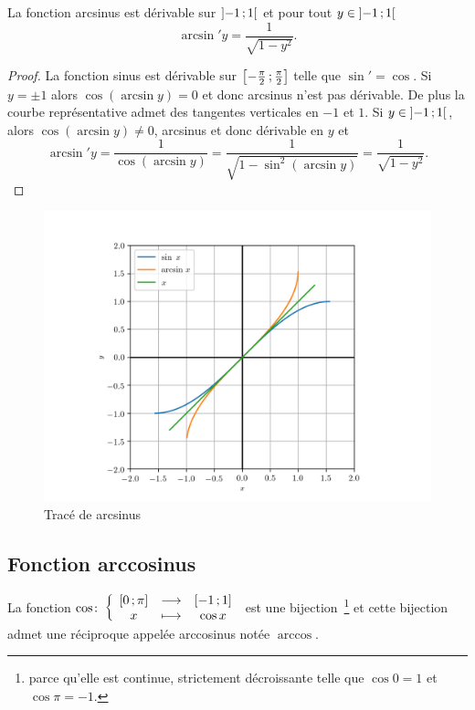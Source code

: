 \begin{prop}
  La fonction arcsinus est dérivable sur \(\left] -1 \, ; {} 1 \right[\) et pour tout
  \(y \in \left] -1 \, ; {} 1 \right[\)
  \begin{equation}
    \arcsin'y = \frac{1}{\sqrt{1-y^2}}.
  \end{equation}
\end{prop}

\begin{proof}
  La fonction sinus est dérivable sur
  \(\left[ -\frac{\pi}{2} \, ; {} \frac{\pi}{2} \right]\) telle que \(\sin' = \cos\).
  Si \(y = \pm 1\) alors \(\cos(\arcsin y) = 0\) et donc arcsinus n'est pas
  dérivable. De plus la courbe représentative admet des tangentes verticales en
  \(-1\) et \(1\). Si \(y \in \left] -1 \, ; {} 1 \right[\), alors \(\cos(\arcsin y)
  \neq 0\), arcsinus et donc dérivable en \(y\) et
  \[\arcsin' y = \frac{1}{\cos( \arcsin y)} = \frac{1}{\sqrt{1-\sin^2(\arcsin
  y)}} = \frac{1}{\sqrt{1-y^2}}.\]
\end{proof}

\begin{figure}
  \centering
  \includegraphics[scale = 0.8]{arcsin.png}
  \caption{Tracé de arcsinus}\label{fig:tracearcsinus}
\end{figure}

\subsection{Fonction arccosinus}\label{subsec:chap1-fonctionarccos}

\begin{defdef}
  La fonction
  \(\cos\colon\left\{\begin{array}{ccc}\left[ 0 \, ; {} \pi \right] & \longrightarrow &\left[ -1 \, ; {} 1 \right]\\x & \longmapsto & \cos x\end{array}\right.\)
  est une bijection~\footnote{parce qu'elle est continue, strictement
  décroissante telle que \(\cos 0 = 1\) et \(\cos \pi = -1\).} et cette
  bijection admet une réciproque appelée arccosinus notée \(\arccos\).
\end{defdef}

